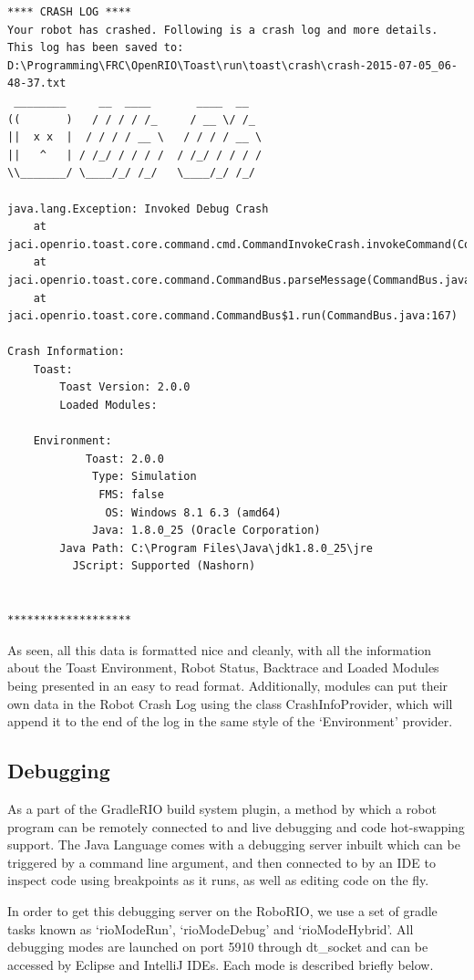 \documentclass[a4paper,12pt]{article}
\begin{document}
\begin{lstlisting}
**** CRASH LOG ****
Your robot has crashed. Following is a crash log and more details.
This log has been saved to: D:\Programming\FRC\OpenRIO\Toast\run\toast\crash\crash-2015-07-05_06-48-37.txt
 ________     __  ____       ____  __
((       )   / / / / /_     / __ \/ /_
||  x x  |  / / / / __ \   / / / / __ \
||   ^   | / /_/ / / / /  / /_/ / / / /
\\_______/ \____/_/ /_/   \____/_/ /_/

java.lang.Exception: Invoked Debug Crash
    at jaci.openrio.toast.core.command.cmd.CommandInvokeCrash.invokeCommand(CommandInvokeCrash.java:35)
    at jaci.openrio.toast.core.command.CommandBus.parseMessage(CommandBus.java:78)
    at jaci.openrio.toast.core.command.CommandBus$1.run(CommandBus.java:167)

Crash Information:
    Toast:
        Toast Version: 2.0.0
        Loaded Modules:

    Environment:
            Toast: 2.0.0
             Type: Simulation
              FMS: false
               OS: Windows 8.1 6.3 (amd64)
             Java: 1.8.0_25 (Oracle Corporation)
        Java Path: C:\Program Files\Java\jdk1.8.0_25\jre
          JScript: Supported (Nashorn)


*******************
\end{lstlisting}

As seen, all this data is formatted nice and cleanly, with all the information about the Toast Environment, Robot Status, Backtrace and Loaded Modules being presented in an easy to read format. Additionally, modules can put their own data in the Robot Crash Log using the class CrashInfoProvider, which will append it to the end of the log in the same style of the `Environment' provider.

\subsection{Debugging}
As a part of the GradleRIO build system plugin, a method by which a robot program can be remotely connected to and live debugging and code hot-swapping support. The Java Language comes with a debugging server inbuilt which can be triggered by a command line argument, and then connected to by an IDE to inspect code using breakpoints as it runs, as well as editing code on the fly. 

In order to get this debugging server on the RoboRIO, we use a set of gradle tasks known as `rioModeRun', `rioModeDebug' and `rioModeHybrid'. All debugging modes are launched on port 5910 through dt\_socket and can be accessed by Eclipse and IntelliJ IDEs. Each mode is described briefly below.
\end{document}
